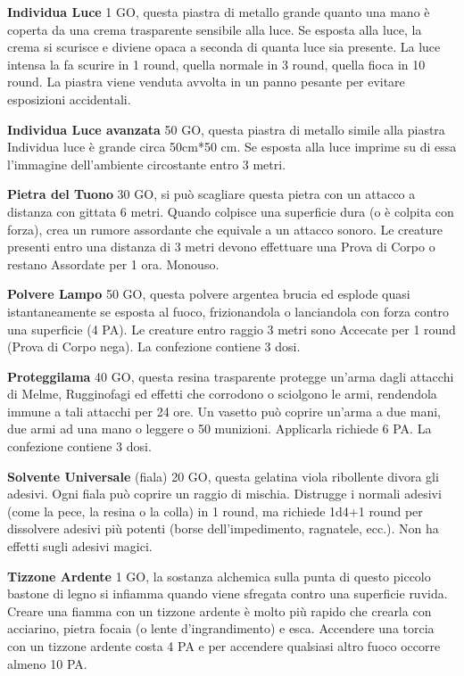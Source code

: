 \documentclass[12pt,a4paper,twoside,openany]{book}
\begin{document}
\begin{multicols}{2}
\textbf{Individua Luce} 1 GO, questa piastra di metallo grande quanto una mano è coperta da una crema trasparente sensibile alla luce. Se esposta alla luce, la crema si scurisce e diviene opaca a seconda di quanta luce sia presente. La luce intensa la fa scurire in 1 round, quella normale in 3 round, quella fioca in 10 round.
La piastra viene venduta avvolta in un panno pesante per evitare esposizioni accidentali. 

\textbf{Individua Luce avanzata} 50 GO, questa piastra di metallo simile alla piastra Individua luce è grande circa 50cm*50 cm. Se esposta alla luce imprime su di essa l'immagine dell'ambiente circostante entro 3 metri.

\textbf{Pietra del Tuono} 30 GO, si può scagliare questa pietra con un attacco a distanza con gittata 6 metri. Quando colpisce una superficie dura (o è colpita con forza), crea un rumore assordante che equivale a un attacco sonoro. Le creature presenti entro una distanza di 3 metri devono effettuare una Prova di Corpo o restano Assordate per 1 ora. Monouso.

\textbf{Polvere Lampo} 50 GO, questa polvere argentea brucia ed esplode quasi istantaneamente se esposta al fuoco, frizionandola o lanciandola con forza contro una superficie (4 PA). Le creature entro raggio 3 metri sono Accecate per 1 round (Prova di Corpo nega). La confezione contiene 3 dosi. 

\textbf{Proteggilama} 40 GO, questa resina trasparente protegge un'arma dagli attacchi di Melme, Rugginofagi ed effetti che corrodono o sciolgono le armi, rendendola immune a tali attacchi per 24 ore. Un vasetto può coprire un'arma a due mani, due armi ad una mano o leggere o 50 munizioni. Applicarla richiede 6 PA. La confezione contiene 3 dosi.

\textbf{Solvente Universale} (fiala) 20 GO, questa gelatina viola ribollente divora gli adesivi. Ogni fiala può coprire un raggio di mischia. Distrugge i normali adesivi (come la pece, la resina o la colla) in 1 round, ma richiede 1d4+1 round per dissolvere adesivi più potenti (borse dell'impedimento, ragnatele, ecc.). Non ha effetti sugli adesivi magici.

\textbf{Tizzone Ardente} 1 GO, la sostanza alchemica sulla punta di questo piccolo bastone di legno si infiamma quando viene sfregata contro una superficie ruvida. Creare una fiamma con un tizzone ardente è molto più rapido che crearla con acciarino, pietra focaia (o lente d'ingrandimento) e esca. Accendere una torcia con un tizzone ardente costa 4 PA e per accendere qualsiasi altro fuoco occorre almeno 10 PA.


\end{multicols}
\end{document}
